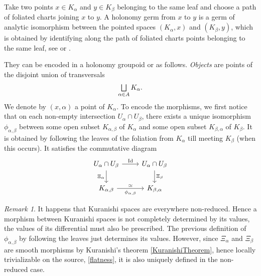 \documentclass[10pt]{amsart}
\let\oldbigsqcup\bigsqcup
\renewcommand{\bigsqcup}{\mathop{\textstyle\oldbigsqcup}\displaylimits}
\DeclareMathOperator{\Id}{Id}
\theoremstyle{plain}
\theoremstyle{definition}
\theoremstyle{remark}
\newtheorem{remark}[theorem]{Remark}
\numberwithin{equation}{section}
\let\uniondisjointe\bigsqcup
\begin{document}
Take two points $x\in K_\alpha$ and $y\in K_\beta$ belonging to the same leaf and choose a path of foliated charts joining $x$ to $y$. A holonomy germ from $x$ to $y$ is a germ of analytic isomorphism between the pointed spaces $(K_\alpha,x)$ and $(K_\beta,y)$, which is obtained by identifying along the path of foliated charts points belonging to the same leaf, see \cite[\S 2.1]{Moerdijk} or \cite{CLN}.

They can be encoded in a holonomy groupoid \cite[\S 5.2]{Moerdijk} or \cite{Ha} as follows. \emph{Objects} are points of the disjoint union of transversals
\begin{equation}
\label{objectshg}
\uniondisjointe_{\alpha\in A} K_\alpha.
\end{equation}
We denote by $(x,\alpha)$ a point of $K_\alpha$. To encode the morphisms, we first notice that on each non-empty intersection $U_{\alpha}\cap U_{\beta}$, there exists a unique isomorphism $\phi_{\alpha,\beta}$ between some open subset $K_{\alpha, \beta}$ of $K_{\alpha}$ and some open subset $K_{\beta, \alpha}$ of $K_{\beta}$. It is obtained by following the leaves of the foliation from $K_{\alpha}$ till meeting $K_{\beta}$ (when this occurs). It satisfies the commutative diagram\vspace*{-3pt}
\begin{equation}
\label{CDhol}
\begin{tikzcd}
U_{\alpha}\cap U_{\beta} \arrow[d,"\Xi_{\alpha}"']\arrow[r,"\Id"] &U_{\alpha}\cap U_{\beta}\arrow[d,"\Xi_{\beta}"]\\
K_{\alpha,\beta}\arrow[r,"\simeq","\phi_{\alpha,\beta}"'] &K_{\beta,\alpha}
\end{tikzcd}
\end{equation}

\begin{remark}
\label{reducedrigidified}
It happens that Kuranishi spaces are everywhere non-reduced. Hence a morphism between Kuranishi spaces is not completely determined by its values, the values of its differential must also be prescribed. The previous definition of $\phi_{\alpha,\beta}$ by following the leaves just determines its values. However, since $\Xi_\alpha$ and $\Xi_\beta$ are smooth morphisms by Kuranishi's theorem \ref{KuranishiTheorem}, hence locally trivializable on the source, \cf \eqref{flatness}, it is also uniquely defined in the non-reduced case.
\end{remark}
\end{document}
